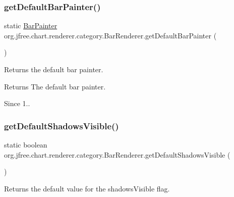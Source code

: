 \subsubsection{\texorpdfstring{get\+Default\+Bar\+Painter()}{getDefaultBarPainter()}}
{\footnotesize\ttfamily static \mbox{\hyperlink{interfaceorg_1_1jfree_1_1chart_1_1renderer_1_1category_1_1_bar_painter}{Bar\+Painter}} org.\+jfree.\+chart.\+renderer.\+category.\+Bar\+Renderer.\+get\+Default\+Bar\+Painter (\begin{DoxyParamCaption}{ }\end{DoxyParamCaption})\hspace{0.3cm}{\ttfamily [static]}}

Returns the default bar painter.

\begin{DoxyReturn}{Returns}
The default bar painter.
\end{DoxyReturn}
\begin{DoxySince}{Since}
1.. 
\end{DoxySince}
\mbox{\label{classorg_1_1jfree_1_1chart_1_1renderer_1_1category_1_1_bar_renderer_a0aabafc66981c21dd8fa5b98193d5a9d}} 
\subsubsection{\texorpdfstring{get\+Default\+Shadows\+Visible()}{getDefaultShadowsVisible()}}
{\footnotesize\ttfamily static boolean org.\+jfree.\+chart.\+renderer.\+category.\+Bar\+Renderer.\+get\+Default\+Shadows\+Visible (\begin{DoxyParamCaption}{ }\end{DoxyParamCaption})\hspace{0.3cm}{\ttfamily [static]}}

Returns the default value for the {\ttfamily shadows\+Visible} flag.

